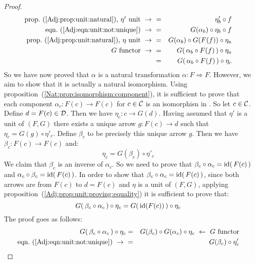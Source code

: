 \begin{proof}
\begin{eqnarray*}
            \mbox{prop.~(\ref{Adj:prop:unit:natural}), $\eta'$ unit}\ \to\ 
            &=&\eta'_{b}\circ f\\
            \mbox{eqn.~(\ref{Adj:eqn:unit:not:unique})}\ \to\ 
            &=&G(\alpha_{b})\circ\eta_{b}\circ f\\
            \mbox{prop.~(\ref{Adj:prop:unit:natural}), $\eta$ unit}\ \to\ 
            &=&G(\alpha_{b})\circ G(F(f))\circ\eta_{a}\\
            \mbox{$G$ functor}\ \to\ 
            &=&G(\,\alpha_{b}\circ F(f)\,)\circ\eta_{a}\\
            &=&G(\,\alpha_{b}\circ F(f)\,)\circ\eta_{c}\\
        \end{eqnarray*}
    So we have now proved that $\alpha$ is a natural transformation
    $\alpha:F\Rightarrow F$. However, we aim to show that it is actually
    a natural isomorphism. 
    Using proposition~(\ref{Nat:prop:isomorphism:component}), it is sufficient
    to prove that each component $\alpha_{c}:F(c)\to F(c)$ for $c\in\mbox{$\cal C$}$ is 
    an isomorphisn in \Dat. So let $c\in\mbox{$\cal C$}$. Define $d=F(c)\in\mbox{$\cal D$}$. Then we 
    have $\eta_{c}:c\to G(d)$. Having assumed that $\eta'$ is a unit of $(F,G)$ 
    there exists a unique arrow $g:F(c)\to d$ such that 
    $\eta_{c}=G(g)\circ\eta'_{c}$. Define $\beta_{c}$ to be precisely this 
    unique arrow $g$. Then we have $\beta_{c}:F(c)\to F(c)$ and:
        \begin{equation}\label{Adj:eqn:counit:not:unique:2}
            \eta_{c}=G(\beta_{c})\circ\eta'_{c}
        \end{equation}
    We claim that $\beta_{c}$ is an inverse of $\alpha_{c}$. So we need to prove 
    that $\beta_{c}\circ\alpha_{c}=\mbox{\rm id}(\,F(c)\,)$ and 
    $\alpha_{c}\circ\beta_{c}=\mbox{\rm id}(\,F(c)\,)$.
    In order to show that $\beta_{c}\circ\alpha_{c}=\mbox{\rm id}(\,F(c)\,)$, since both 
    arrows are from $F(c)$ to $d=F(c)$ and $\eta$ is a unit of $(F,G)$, applying
    proposition~(\ref{Adj:prop:unit:proving:equality}) it is sufficient to prove 
    that:
        \[
            G(\,\beta_{c}\circ\alpha_{c}\,)\circ\eta_{c} 
            = 
            G(\,\mbox{\rm id}(F(c))\,)\circ\eta_{c}
        \]
    The proof goes as follows:
        \begin{eqnarray*}G(\,\beta_{c}\circ\alpha_{c}\,)\circ\eta_{c}
            &=&G(\beta_{c})\circ G(\alpha_{c})\circ\eta_{c}
            \ \leftarrow\ \mbox{$G$ functor}\\
            \mbox{eqn.~(\ref{Adj:eqn:unit:not:unique})}\ \to\ 
            &=&G(\beta_{c})\circ\eta'_{c}\\

\end{eqnarray*}
\end{proof}
